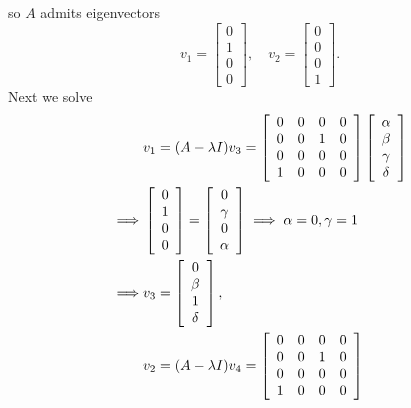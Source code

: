 \documentclass{article}
\begin{document}
so $A$ admits eigenvectors
$$
v_1 = \left[\begin{array}{c}
  0 \\ 1 \\ 0 \\ 0
\end{array}\right], \quad
v_2 = \left[\begin{array}{c}
  0 \\ 0 \\ 0 \\ 1
\end{array}\right].
$$
Next we solve
\begin{align*}
& v_1 = (A - \lambda I) v_3 =
\left[\begin{array}{c c c c}
0 & 0 & 0 & 0 \\
0 & 0 & 1 & 0 \\
0 & 0 & 0 & 0 \\
1 & 0 & 0 & 0 
\end{array}\right]
\left[\begin{array}{c}
\alpha \\ \beta \\ \gamma \\ \delta
\end{array}\right] \\
\implies &
\left[\begin{array}{c}
0 \\ 1 \\ 0 \\ 0
\end{array}\right]
= \left[\begin{array}{c}
  0 \\ \gamma \\ 0 \\ \alpha
\end{array}\right]
\implies
\alpha = 0, \gamma = 1 \\
\implies &
v_3 = \left[\begin{array}{c}
  0 \\ \beta \\ 1 \\ \delta
\end{array}\right], \\
& v_2 = (A - \lambda I) v_4 =
\left[\begin{array}{c c c c}
0 & 0 & 0 & 0 \\
0 & 0 & 1 & 0 \\
0 & 0 & 0 & 0 \\
1 & 0 & 0 & 0 
\end{array}\right]

\end{align*}
\end{document}

